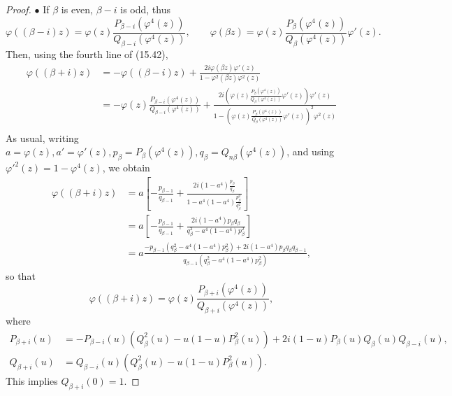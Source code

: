 \documentclass[11pt,a4paper]{article}
\begin{document}
\begin{proof}
$\bullet$ If $\beta$ is even, $\beta - i$ is odd, thus
$$
\varphi((\beta - i)z) = \varphi(z) \frac{P_{\beta - i}\left(\varphi^4(z)\right)}{Q_{\beta - i}\left(\varphi^4(z)\right)},\qquad
 \varphi(\beta z)= \varphi(z) \frac{P_{\beta}\left(\varphi^4(z)\right)}{Q_{\beta}\left(\varphi^4(z)\right)}\varphi'(z).
$$
Then, using the fourth line of (15.42),
\begin{align*}
\varphi((\beta + i)z) &= -\varphi((\beta - i)z) + \frac{2i \varphi(\beta z) \varphi'(z)}{1 - \varphi^2(\beta z) \varphi^2(z)}\\
&= - \varphi(z) \frac{P_{\beta - i}\left(\varphi^4(z)\right)}{Q_{\beta - i}\left(\varphi^4(z)\right)} + \frac{2i \left(\varphi(z) \frac{P_{\beta}\left(\varphi^4(z)\right)}{Q_{\beta}\left(\varphi^4(z)\right)}\varphi'(z)\right) \varphi'(z)}{1 - \left(\varphi(z) \frac{P_{\beta}\left(\varphi^4(z)\right)}{Q_{\beta}\left(\varphi^4(z)\right)}\varphi'(z)\right)^2 \varphi^2(z)}\\
\end{align*}
As usual, writing $a = \varphi(z), a' = \varphi'(z), p_\beta = P_{\beta}(\varphi^4(z)), q_\beta = Q_{n\beta}(\varphi^4(z))$, and using $\varphi'^2(z) = 1 - \varphi^4(z)$, we obtain
\begin{align*}
\varphi((\beta + i)z) &= a \left[ -\frac{p_{\beta-1}}{q_{\beta-1}} + \frac{2 i(1-a^4)\frac{p_\beta}{q_\beta} }{1 - a^4(1-a^4) \frac{p_\beta^2}{q_\beta^2}} \right] \\
&=a \left[  -\frac{p_{\beta-1}}{q_{\beta-1}} + \frac{2i(1-a^4)p_\beta q_\beta}{q_\beta^2 - a^4(1-a^4)p_\beta^2}\right] \\
&=a \frac {-p_{\beta-1}(q_\beta^2 - a^4(1-a^4) p_\beta^2) + 2i(1-a^4) p_\beta q_\beta q_{\beta -1}}{q_{\beta-1}(q_\beta^2 - a^4(1-a^4)p_\beta^2)},
\end{align*}
so that
$$\varphi((\beta + i)z) = \varphi(z) \frac{P_{\beta + i}(\varphi^4(z))}{Q_{\beta + i}(\varphi^4(z))},$$
where
\begin{align*}
P_{\beta + i}(u) &= -P_{\beta - i}(u) ( Q_{\beta}^2(u) - u(1-u)P_{\beta}^2(u)) + 2i(1 - u) P_{\beta}(u) Q_{\beta}(u) Q_{\beta - i}(u),\\
Q_{\beta + i}(u) &=Q_{\beta - i}(u) (Q_{\beta}^2(u) - u(1-u) P_{\beta}^2(u)).
\end{align*}
This implies $Q_{\beta + i}(0) = 1$. 

\bigskip


\end{proof}
\end{document}
